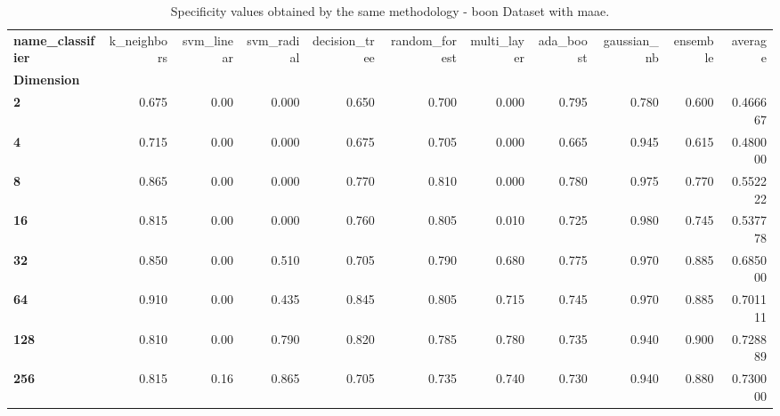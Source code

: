\begin{table}
\centering
\caption{Specificity values obtained by the same methodology - boon Dataset with maae.}
\label{specificity_boon_maae-reproduction}
\begin{tabular}{lrrrrrrrrrr}
\toprule
\textbf{name\_classifier} &  k\_neighbors &  svm\_linear &  svm\_radial &  decision\_tree &  random\_forest &  multi\_layer &  ada\_boost &  gaussian\_nb &  ensemble &   average \\
\textbf{Dimension} &              &             &             &                &                &              &            &              &           &           \\
\midrule
\textbf{2        } &        0.675 &        0.00 &       0.000 &          0.650 &          0.700 &        0.000 &      0.795 &        0.780 &     0.600 &  0.466667 \\
\textbf{4        } &        0.715 &        0.00 &       0.000 &          0.675 &          0.705 &        0.000 &      0.665 &        0.945 &     0.615 &  0.480000 \\
\textbf{8        } &        0.865 &        0.00 &       0.000 &          0.770 &          0.810 &        0.000 &      0.780 &        0.975 &     0.770 &  0.552222 \\
\textbf{16       } &        0.815 &        0.00 &       0.000 &          0.760 &          0.805 &        0.010 &      0.725 &        0.980 &     0.745 &  0.537778 \\
\textbf{32       } &        0.850 &        0.00 &       0.510 &          0.705 &          0.790 &        0.680 &      0.775 &        0.970 &     0.885 &  0.685000 \\
\textbf{64       } &        0.910 &        0.00 &       0.435 &          0.845 &          0.805 &        0.715 &      0.745 &        0.970 &     0.885 &  0.701111 \\
\textbf{128      } &        0.810 &        0.00 &       0.790 &          0.820 &          0.785 &        0.780 &      0.735 &        0.940 &     0.900 &  0.728889 \\
\textbf{256      } &        0.815 &        0.16 &       0.865 &          0.705 &          0.735 &        0.740 &      0.730 &        0.940 &     0.880 &  0.730000 \\
\bottomrule
\end{tabular}
\end{table}
